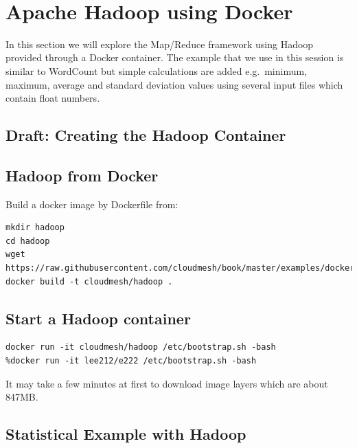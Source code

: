 \label{c:hadoop-docker}

\FILENAME\

\chapter{Apache Hadoop using Docker}


In this section we will explore the 
Map/Reduce framework using Hadoop provided through a Docker
container. The example that we use in this session is similar to
WordCount but simple calculations are added e.g.\ minimum, maximum,
average and standard deviation values using several input files which
contain float numbers.

\section{Draft: Creating the Hadoop Container}

\section{Hadoop from Docker}

Build a docker image by Dockerfile from:

\begin{lstlisting}
mkdir hadoop
cd hadoop
wget https://raw.githubusercontent.com/cloudmesh/book/master/examples/docker/hadoop/Dockerfile
docker build -t cloudmesh/hadoop .
\end{lstlisting}


\section{Start a Hadoop container}

\begin{lstlisting}
docker run -it cloudmesh/hadoop /etc/bootstrap.sh -bash
%docker run -it lee212/e222 /etc/bootstrap.sh -bash
\end{lstlisting}

It may take a few minutes at first to download image layers which are
about 847MB\@.

\section{Statistical Example with Hadoop}  


